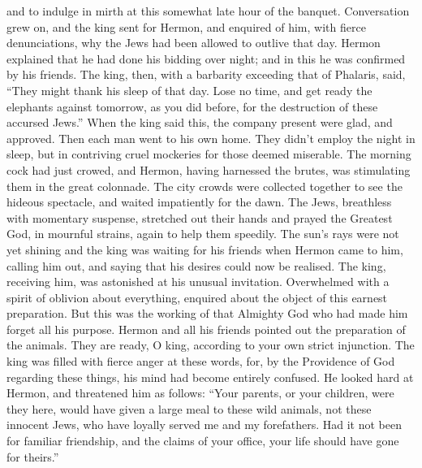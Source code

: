 and to indulge in mirth at this somewhat late hour of the banquet.
 Conversation grew on, and the king sent for Hermon, and
enquired of him, with fierce denunciations, why the Jews had been
allowed to outlive that day.  Hermon explained that he had
done his bidding over night; and in this he was confirmed by his
friends.  The king, then, with a barbarity exceeding that
of Phalaris, said, ``They might thank his sleep of that day. Lose no
time, and get ready the elephants against tomorrow, as you did before,
for the destruction of these accursed Jews.''  When the
king said this, the company present were glad, and approved. Then each
man went to his own home.  They didn't employ the night in
sleep, but in contriving cruel mockeries for those deemed miserable.
 The morning cock had just crowed, and Hermon, having
harnessed the brutes, was stimulating them in the great colonnade.
 The city crowds were collected together to see the hideous
spectacle, and waited impatiently for the dawn.  The Jews,
breathless with momentary suspense, stretched out their hands and prayed
the Greatest God, in mournful strains, again to help them speedily.
 The sun's rays were not yet shining and the king was
waiting for his friends when Hermon came to him, calling him out, and
saying that his desires could now be realised.  The king,
receiving him, was astonished at his unusual invitation. Overwhelmed
with a spirit of oblivion about everything, enquired about the object of
this earnest preparation.  But this was the working of that
Almighty God who had made him forget all his purpose. 
Hermon and all his friends pointed out the preparation of the animals.
They are ready, O king, according to your own strict injunction.
 The king was filled with fierce anger at these words, for,
by the Providence of God regarding these things, his mind had become
entirely confused. He looked hard at Hermon, and threatened him as
follows:  ``Your parents, or your children, were they here,
would have given a large meal to these wild animals, not these innocent
Jews, who have loyally served me and my forefathers.  Had
it not been for familiar friendship, and the claims of your office, your
life should have gone for theirs.''

